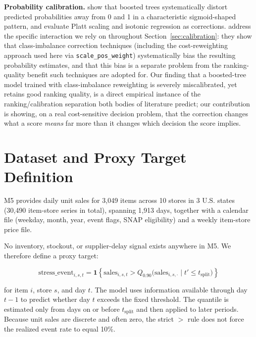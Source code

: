 \documentclass[11pt]{article}
\begin{document}
\textbf{Probability calibration.} \citet{niculescu2005predicting} show that boosted trees systematically distort predicted probabilities away from 0 and 1 in a characteristic sigmoid-shaped pattern, and evaluate Platt scaling \citep{platt1999probabilistic} and isotonic regression \citep{zadrozny2002transforming} as corrections. \citet{wallace2012class} address the specific interaction we rely on throughout Section~\ref{sec:calibration}: they show that class-imbalance correction techniques (including the cost-reweighting approach used here via \texttt{scale\_pos\_weight}) systematically bias the resulting probability estimates, and that this bias is a separate problem from the ranking-quality benefit such techniques are adopted for. Our finding that a boosted-tree model trained with class-imbalance reweighting is severely miscalibrated, yet retains good ranking quality, is a direct empirical instance of the ranking/calibration separation both bodies of literature predict; our contribution is showing, on a real cost-sensitive decision problem, that the correction changes what a score \emph{means} far more than it changes which decision the score implies.

\section{Dataset and Proxy Target Definition}
\label{sec:target}

M5 provides daily unit sales for 3{,}049 items across 10 stores in 3 U.S. states (30{,}490 item-store series in total), spanning 1{,}913 days, together with a calendar file (weekday, month, year, event flags, SNAP eligibility) and a weekly item-store price file.

No inventory, stockout, or supplier-delay signal exists anywhere in M5. We therefore define a proxy target:

\begin{equation}
\text{stress\_event}_{i,s,t} = \mathbf{1}\left\{\text{sales}_{i,s,t} > Q_{0.90}\big(\text{sales}_{i,s,\cdot} \mid t' \le t_{\text{split}}\big)\right\}
\end{equation}

for item $i$, store $s$, and day $t$. The model uses information available through day $t-1$ to predict whether day $t$ exceeds the fixed threshold. The quantile is estimated only from days on or before $t_{\text{split}}$ and then applied to later periods. Because unit sales are discrete and often zero, the strict $>$ rule does not force the realized event rate to equal 10\%.
\end{document}
